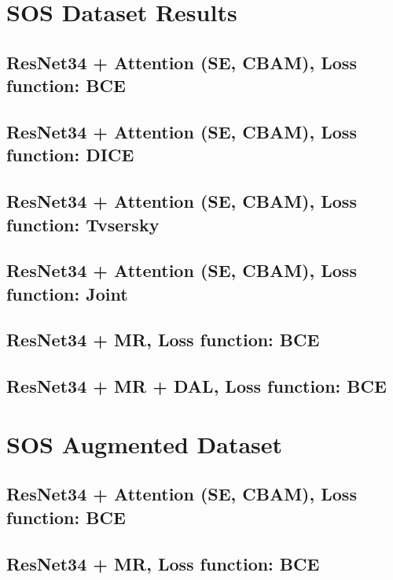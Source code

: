 \documentclass{article}
\begin{document}
\section{SOS Dataset Results}
\subsection{ResNet34 + Attention (SE, CBAM), Loss function: BCE}


\subsection{ResNet34 + Attention (SE, CBAM), Loss function: DICE}


\subsection{ResNet34 + Attention (SE, CBAM), Loss function: Tvsersky}


\subsection{ResNet34 + Attention (SE, CBAM), Loss function: Joint}


\subsection{ResNet34 + MR, Loss function: BCE}


\subsection{ResNet34 + MR + DAL, Loss function: BCE}


\section{SOS Augmented Dataset}
\subsection{ResNet34 + Attention (SE, CBAM), Loss function: BCE}


\subsection{ResNet34 + MR, Loss function: BCE}

\end{document}
